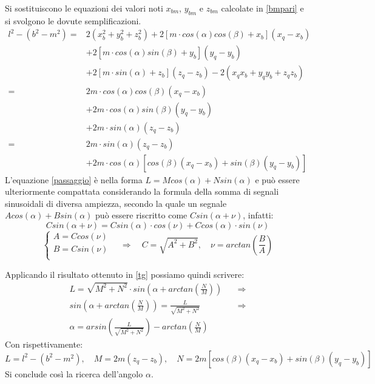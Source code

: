 \documentclass[12pt,twoside,openright]{article}
\begin{document}
Si sostituiscono le equazioni dei valori noti $x_{bm}$, $y_{bm}$ e $z_{bm}$ calcolate in \eqref{bmpari} e si svolgono le dovute semplificazioni.
\begin{align}\label{passaggio}
    l^2-(b^2-m^2) =& 2(x_{b}^2+y_{b}^2+z_{b}^2)+2[m \cdot cos(\alpha)cos(\beta)+x_b](x_q-x_b)\nonumber\\
    &+2[m \cdot cos(\alpha)sin(\beta)+y_b](y_q-y_b)
    \nonumber\\ &+2[m \cdot sin(\alpha)+z_b](z_q-z_b)-2(x_qx_b+y_qy_b+z_qz_b)\nonumber\\
    				   =& 2m \cdot cos(\alpha)cos(\beta)(x_q-x_b)\nonumber\\&+2m \cdot cos(\alpha)sin(\beta)(y_q-y_b)\nonumber\\
    				   & +2m \cdot sin(\alpha)(z_q-z_b)\nonumber\\
    				   =& 2m \cdot sin(\alpha)(z_q-z_b) \nonumber\\
    				   &+2m \cdot cos(\alpha)[cos(\beta)(x_q-x_b)+sin(\beta)(y_q-y_b)]   
\end{align}
L'equazione \eqref{passaggio} è nella forma $L=Mcos(\alpha)+Nsin(\alpha)$ e può essere ulteriormente compattata considerando la formula della somma di segnali sinusoidali di diversa ampiezza, secondo la quale un segnale $Acos(\alpha)+Bsin(\alpha)$ può essere riscritto come $Csin(\alpha + \nu)$, infatti:
\begin{equation}\label{c}
Csin(\alpha + \nu)=Csin(\alpha)\cdot cos(\nu)+Ccos(\alpha)\cdot sin(\nu)\nonumber
\end{equation}
\begin{equation}\label{tg}
    \begin{cases}
      A=Ccos(\nu)\\
      B=Csin(\nu)\\
    \end{cases}\quad \Rightarrow \quad  C=\sqrt{A^2+B^2}, \quad \nu=arctan\left(\frac{B}{A}\right)
\end{equation}

Applicando il risultato ottenuto in \eqref{tg} possiamo quindi scrivere:
\begin{align}\label{alfa}
    L= \sqrt{M^2+N^2}\cdot sin\left(\alpha+arctan\left(\frac{N}{M}\right)\right) \quad  &\Rightarrow\nonumber\\ sin\left(\alpha+arctan\left(\frac{N}{M}\right)\right)=\frac{L}{\sqrt{M^2+N^2}}  \quad  &\Rightarrow\nonumber\\
    \alpha=arsin\left(\frac{L}{\sqrt{M^2+N^2}}\right)-arctan\left(\frac{N}{M}\right)
\end{align}
Con rispettivamente:
\begin{equation}\label{lnm}
L=l^2-(b^2-m^2), \quad M=2m(z_q-z_b), \quad N=2m[cos(\beta)(x_q-x_b)+sin(\beta)(y_q-y_b)]
\end{equation}
Si conclude così la ricerca dell'angolo $\alpha$.
\end{document}
